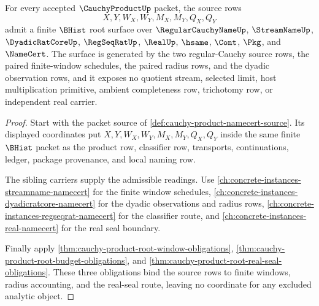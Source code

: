 \begin{theorem}
\label{thm:cauchy-product-root-source-admission}
For every accepted $\CauchyProductUp$ packet, the source rows
$$
X,Y,W_X,W_Y,M_X,M_Y,Q_X,Q_Y
$$
admit a finite $\BHist$ root surface over $\RegularCauchyNameUp$, $\StreamNameUp$, $\DyadicRatCoreUp$, $\RegSeqRatUp$, $\RealUp$, $\hsame$, $\Cont$, $\Pkg$, and $\NameCert$. The surface is generated by the two regular-Cauchy source rows, the paired finite-window schedules, the paired radius rows, and the dyadic observation rows, and it exposes no quotient stream, selected limit, host multiplication primitive, ambient completeness row, trichotomy row, or independent real carrier.
\end{theorem}
\begin{proof}
Start with the packet source of \autoref{def:cauchy-product-namecert-source}. Its displayed coordinates put $X,Y,W_X,W_Y,M_X,M_Y,Q_X,Q_Y$ inside the same finite $\BHist$ packet as the product row, classifier row, transports, continuations, ledger, package provenance, and local naming row.

The sibling carriers supply the admissible readings. Use \autoref{ch:concrete-instances-streamname-namecert} for the finite window schedules, \autoref{ch:concrete-instances-dyadicratcore-namecert} for the dyadic observations and radius rows, \autoref{ch:concrete-instances-regseqrat-namecert} for the classifier route, and \autoref{ch:concrete-instances-real-namecert} for the real seal boundary.

Finally apply \autoref{thm:cauchy-product-root-window-obligations}, \autoref{thm:cauchy-product-root-budget-obligations}, and \autoref{thm:cauchy-product-root-real-seal-obligations}. These three obligations bind the source rows to finite windows, radius accounting, and the real-seal route, leaving no coordinate for any excluded analytic object.
\end{proof}

